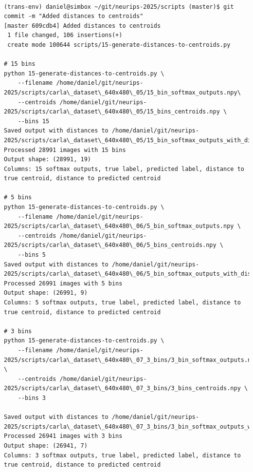 \begin{verbatim}

(trans-env) daniel@simbox ~/git/neurips-2025/scripts (master)$ git commit -m "Added distances to centroids"
[master 609cdb4] Added distances to centroids
 1 file changed, 106 insertions(+)
 create mode 100644 scripts/15-generate-distances-to-centroids.py
 
# 15 bins
python 15-generate-distances-to-centroids.py \
    --filename /home/daniel/git/neurips-2025/scripts/carla\_dataset\_640x480\_05/15_bin_softmax_outputs.npy\
    --centroids /home/daniel/git/neurips-2025/scripts/carla\_dataset\_640x480\_05/15_bins_centroids.npy \
    --bins 15
Saved output with distances to /home/daniel/git/neurips-2025/scripts/carla\_dataset\_640x480\_05/15_bin_softmax_outputs_with_distances.npy
Processed 28991 images with 15 bins
Output shape: (28991, 19)
Columns: 15 softmax outputs, true label, predicted label, distance to true centroid, distance to predicted centroid

# 5 bins
python 15-generate-distances-to-centroids.py \
    --filename /home/daniel/git/neurips-2025/scripts/carla\_dataset\_640x480\_06/5_bin_softmax_outputs.npy \
    --centroids /home/daniel/git/neurips-2025/scripts/carla\_dataset\_640x480\_06/5_bins_centroids.npy \
    --bins 5
Saved output with distances to /home/daniel/git/neurips-2025/scripts/carla\_dataset\_640x480\_06/5_bin_softmax_outputs_with_distances.npy
Processed 26991 images with 5 bins
Output shape: (26991, 9)
Columns: 5 softmax outputs, true label, predicted label, distance to true centroid, distance to predicted centroid

# 3 bins
python 15-generate-distances-to-centroids.py \
    --filename /home/daniel/git/neurips-2025/scripts/carla\_dataset\_640x480\_07_3_bins/3_bin_softmax_outputs.npy \
    --centroids /home/daniel/git/neurips-2025/scripts/carla\_dataset\_640x480\_07_3_bins/3_bins_centroids.npy \
    --bins 3
    
Saved output with distances to /home/daniel/git/neurips-2025/scripts/carla\_dataset\_640x480\_07_3_bins/3_bin_softmax_outputs_with_distances.npy
Processed 26941 images with 3 bins
Output shape: (26941, 7)
Columns: 3 softmax outputs, true label, predicted label, distance to true centroid, distance to predicted centroid
    

\end{verbatim}

